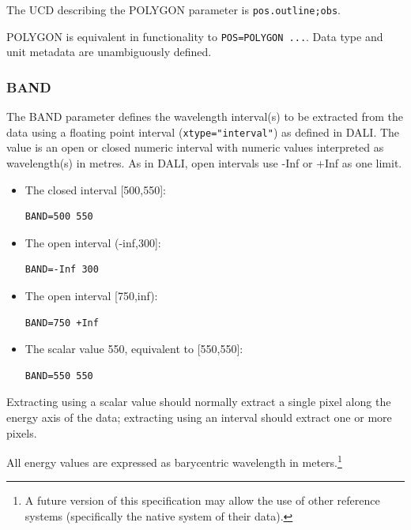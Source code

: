 \documentclass[11pt,a4paper]{ivoa}
\newcommand{\ucd}[1]{\texttt{#1}}
\begin{document}
The UCD describing the POLYGON parameter is
\ucd{pos.outline;obs}.

POLYGON is equivalent in functionality to \texttt{POS=POLYGON ...}.  Data type  and unit metadata are unambiguously defined.


\subsubsection{BAND}
\label{sec:BAND}

The BAND parameter defines the wavelength interval(s) to be extracted from
the data using a floating point interval (\verb|xtype="interval"|) as
defined in DALI.  The value is an open or closed numeric
interval with numeric values interpreted as wavelength(s) in metres. As
in DALI, open intervals use -Inf or +Inf as one limit.

\begin{itemize}
\item The closed interval [500,550]:

\begin{lstlisting}
BAND=500 550
\end{lstlisting}

\item The open interval (-inf,300]:

\begin{lstlisting}
BAND=-Inf 300
\end{lstlisting}

\item The open interval [750,inf):

\begin{lstlisting}
BAND=750 +Inf
\end{lstlisting}

\item The scalar value 550, equivalent to [550,550]:

\begin{lstlisting}
BAND=550 550
\end{lstlisting}

\end{itemize}

Extracting using a scalar value should normally extract a
single pixel along the energy axis of the data; extracting
using an interval should extract one or more pixels.

All energy values are expressed as barycentric wavelength in
meters.\footnote{A future version of this specification may allow the
use of other reference systems (specifically the native
system of their data).}
\end{document}

